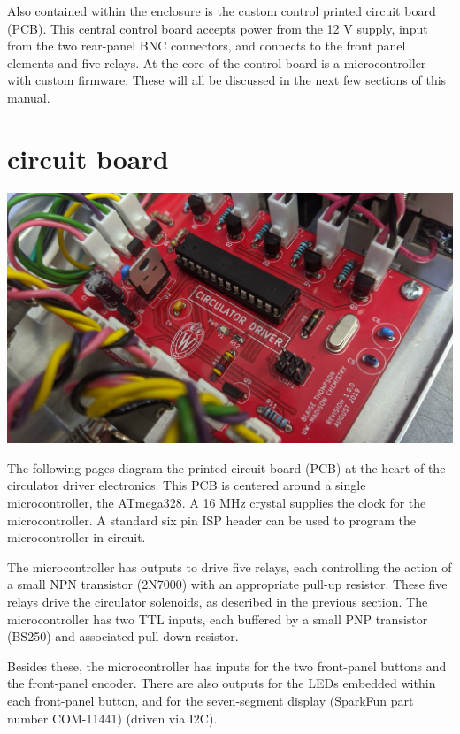 \documentclass{manual}
\begin{document}
Also contained within the enclosure is the custom control printed circuit board (PCB).
This central control board accepts power from the 12 V supply, input from the two rear-panel BNC connectors, and connects to the front panel elements and five relays.
At the core of the control board is a microcontroller with custom firmware.
These will all be discussed in the next few sections of this manual.

\section{circuit board}

\begin{center}
  \includegraphics[width=\linewidth]{../pictures/2019-10-23_114657}
\end{center}

The following pages diagram the printed circuit board (PCB) at the heart of the circulator driver electronics.
This PCB is centered around a single microcontroller, the ATmega328.
A 16 MHz crystal supplies the clock for the microcontroller.
A standard six pin ISP header can be used to program the microcontroller in-circuit.

The microcontroller has outputs to drive five relays, each controlling the action of a small NPN transistor (2N7000) with an appropriate pull-up resistor.
These five relays drive the circulator solenoids, as described in the previous section.
The microcontroller has two TTL inputs, each buffered by a small PNP transistor (BS250) and associated pull-down resistor.

Besides these, the microcontroller has inputs for the two front-panel buttons and the front-panel encoder.
There are also outputs for the LEDs embedded within each front-panel button, and for the seven-segment display (SparkFun part number COM-11441) (driven via I2C).
\end{document}
